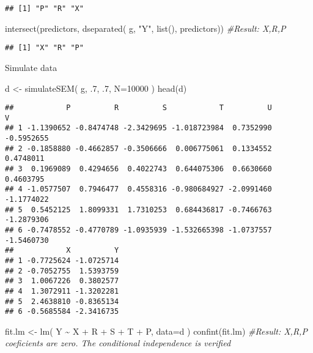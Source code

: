 \documentclass[
]{article}
\newenvironment{Shaded}{\begin{snugshade}}{\end{snugshade}}
\newcommand{\AttributeTok}[1]{\textcolor[rgb]{0.77,0.63,0.00}{#1}}
\newcommand{\CommentTok}[1]{\textcolor[rgb]{0.56,0.35,0.01}{\textit{#1}}}
\newcommand{\DecValTok}[1]{\textcolor[rgb]{0.00,0.00,0.81}{#1}}
\newcommand{\FunctionTok}[1]{\textcolor[rgb]{0.00,0.00,0.00}{#1}}
\newcommand{\NormalTok}[1]{#1}
\newcommand{\OtherTok}[1]{\textcolor[rgb]{0.56,0.35,0.01}{#1}}
\newcommand{\SpecialCharTok}[1]{\textcolor[rgb]{0.00,0.00,0.00}{#1}}
\newcommand{\StringTok}[1]{\textcolor[rgb]{0.31,0.60,0.02}{#1}}
\begin{document}
\begin{verbatim}
## [1] "P" "R" "X"
\end{verbatim}

\begin{Shaded}
\begin{Highlighting}[]
\FunctionTok{intersect}\NormalTok{(predictors, }\FunctionTok{dseparated}\NormalTok{( g, }\StringTok{"Y"}\NormalTok{, }\FunctionTok{list}\NormalTok{(), predictors)) }\CommentTok{\#Result: X,R,P}
\end{Highlighting}
\end{Shaded}

\begin{verbatim}
## [1] "X" "R" "P"
\end{verbatim}

Simulate data

\begin{Shaded}
\begin{Highlighting}[]
\NormalTok{d }\OtherTok{\textless{}{-}} \FunctionTok{simulateSEM}\NormalTok{( g, .}\DecValTok{7}\NormalTok{, .}\DecValTok{7}\NormalTok{, }\AttributeTok{N=}\DecValTok{10000}\NormalTok{ )}
\FunctionTok{head}\NormalTok{(d)}
\end{Highlighting}
\end{Shaded}

\begin{verbatim}
##            P          R          S            T          U          V
## 1 -1.1390652 -0.8474748 -2.3429695 -1.018723984  0.7352990 -0.5952655
## 2 -0.1858880 -0.4662857 -0.3506666  0.006775061  0.1334552  0.4748011
## 3  0.1969089  0.4294656  0.4022743  0.644075306  0.6630660  0.4603795
## 4 -1.0577507  0.7946477  0.4558316 -0.980684927 -2.0991460 -1.1774022
## 5  0.5452125  1.8099331  1.7310253  0.684436817 -0.7466763 -1.2879306
## 6 -0.7478552 -0.4770789 -1.0935939 -1.532665398 -1.0737557 -1.5460730
##            X          Y
## 1 -0.7725624 -1.0725714
## 2 -0.7052755  1.5393759
## 3  1.0067226  0.3802577
## 4  1.3072911 -1.3202281
## 5  2.4638810 -0.8365134
## 6 -0.5685584 -2.3416735
\end{verbatim}

\begin{Shaded}
\begin{Highlighting}[]
\NormalTok{fit.lm }\OtherTok{\textless{}{-}} \FunctionTok{lm}\NormalTok{( Y }\SpecialCharTok{\textasciitilde{}}\NormalTok{ X }\SpecialCharTok{+}\NormalTok{ R }\SpecialCharTok{+}\NormalTok{ S }\SpecialCharTok{+}\NormalTok{ T }\SpecialCharTok{+}\NormalTok{ P, }\AttributeTok{data=}\NormalTok{d )}
\FunctionTok{confint}\NormalTok{(fit.lm) }\CommentTok{\#Result: X,R,P coeficients are zero. The conditional independence is verified}
\end{Highlighting}
\end{Shaded}
\end{document}
